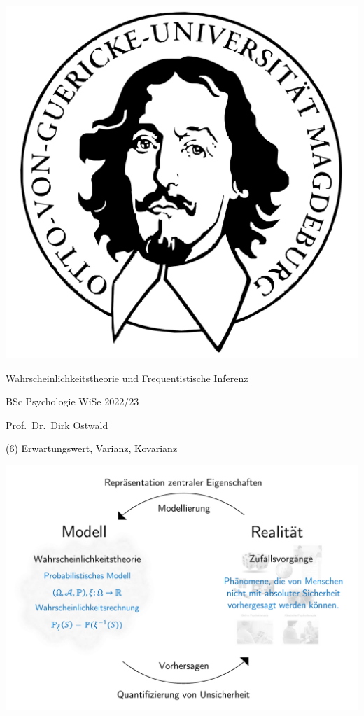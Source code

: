 \documentclass[
  8pt,
  ignorenonframetext,
]{beamer}
\author{}
\date{\vspace{-2.5em}}
\begin{document}
\begin{frame}[plain]{}
\protect\hypertarget{section}{}
\center

\begin{center}\includegraphics[width=0.2\linewidth]{6_Abbildungen/wtfi_6_otto} \end{center}

\vspace{2mm}

\Large

Wahrscheinlichkeitstheorie und Frequentistische Inferenz \vspace{6mm}

\large

BSc Psychologie WiSe 2022/23

\vspace{6mm}
\large

Prof.~Dr.~Dirk Ostwald
\end{frame}

\begin{frame}[plain]{}
\protect\hypertarget{section-1}{}
\vfill
\center
\huge

\textcolor{black}{(6) Erwartungswert, Varianz, Kovarianz} \vfill
\end{frame}

\begin{frame}{}
\protect\hypertarget{section-2}{}
\begin{center}\includegraphics[width=0.85\linewidth]{6_Abbildungen/wtfi_6_wahrscheinlichkeitstheorie_modell} \end{center}
\end{frame}
\end{document}
